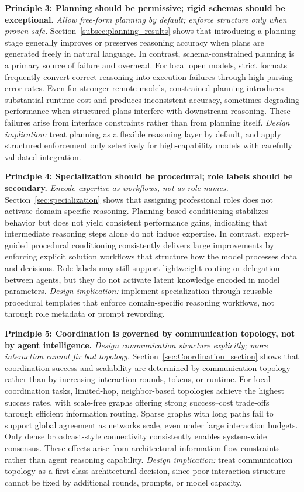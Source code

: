 \smallskip
\noindent\textbf{Principle 3: Planning should be permissive; rigid schemas should be exceptional.}
\emph{Allow free-form planning by default; enforce structure only when proven safe.}
Section~\ref{subsec:planning_results} shows that introducing a planning stage generally improves or preserves reasoning accuracy when plans are generated freely in natural language. In contrast, schema-constrained planning is a primary source of failure and overhead. For local open models, strict formats frequently convert correct reasoning into execution failures through high parsing error rates. Even for stronger remote models, constrained planning introduces substantial runtime cost and produces inconsistent accuracy, sometimes degrading performance when structured plans interfere with downstream reasoning. These failures arise from interface constraints rather than from planning itself.
\emph{Design implication:} treat planning as a flexible reasoning layer by default, and apply structured enforcement only selectively for high-capability models with carefully validated integration.

\noindent\textbf{Principle 4: Specialization should be procedural; role labels should be secondary.}
\emph{Encode expertise as workflows, not as role names.}
Section~\ref{sec:specialization} shows that assigning professional roles does not activate domain-specific reasoning. Planning-based conditioning stabilizes behavior but does not yield consistent performance gains, indicating that intermediate reasoning steps alone do not induce expertise. In contrast, expert-guided procedural conditioning consistently delivers large improvements by enforcing explicit solution workflows that structure how the model processes data and decisions. Role labels may still support lightweight routing or delegation between agents, but they do not activate latent knowledge encoded in model parameters.
\emph{Design implication:} implement specialization through reusable procedural templates that enforce domain-specific reasoning workflows, not through role metadata or prompt rewording.\shorten

\smallskip
\noindent\textbf{Principle 5: Coordination is governed by communication topology, not by agent intelligence.}
\emph{Design communication structure explicitly; more interaction cannot fix bad topology.}
Section~\ref{sec:Coordination_section} shows that coordination success and scalability are determined by communication topology rather than by increasing interaction rounds, tokens, or runtime. For local coordination tasks, limited-hop, neighbor-based topologies achieve the highest success rates, with scale-free graphs offering strong success--cost trade-offs through efficient information routing. Sparse graphs with long paths fail to support global agreement as networks scale, even under large interaction budgets. Only dense broadcast-style connectivity consistently enables system-wide consensus. These effects arise from architectural information-flow constraints rather than agent reasoning capability. \emph{Design implication:} treat communication topology as a first-class architectural decision, since poor interaction structure cannot be fixed by additional rounds, prompts, or model capacity.\shorten

